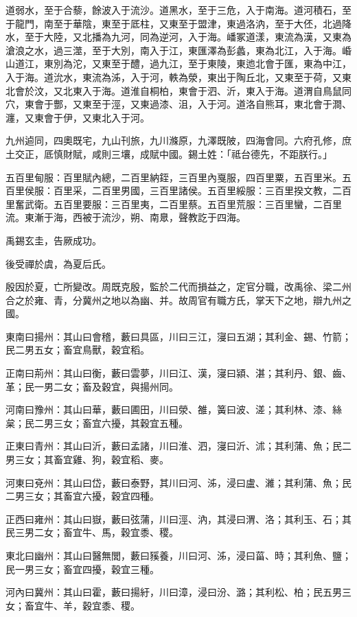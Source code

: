 \begin{pinyinscope}
道弱水，至于合藜，餘波入于流沙。道黑水，至于三危，入于南海。道河積石，至于龍門，南至于華陰，東至于厎柱，又東至于盟津，東過洛汭，至于大伾，北過降水，至于大陸，又北播為九河，同為逆河，入于海。嶓冢道漾，東流為漢，又東為滄浪之水，過三澨，至于大別，南入于江，東匯澤為彭蠡，東為北江，入于海。崏山道江，東別為沱，又東至于醴，過九江，至于東陵，東迆北會于匯，東為中江，入于海。道沇水，東流為泲，入于河，軼為滎，東出于陶丘北，又東至于荷，又東北會於汶，又北東入于海。道淮自桐柏，東會于泗、沂，東入于海。道渭自鳥鼠同穴，東會于酆，又東至于涇，又東過漆、沮，入于河。道洛自熊耳，東北會于澗、瀍，又東會于伊，又東北入于河。

九州逌同，四奧既宅，九山刊旅，九川滌原，九澤既陂，四海會同。六府孔修，庶土交正，厎慎財賦，咸則三壤，成賦中國。錫土姓：「祗台德先，不距朕行。」

五百里甸服：百里賦內總，二百里納銍，三百里內戛服，四百里粟，五百里米。五百里侯服：百里采，二百里男國，三百里諸侯。五百里綏服：三百里揆文教，二百里奮武衛。五百里要服：三百里夷，二百里蔡。五百里荒服：三百里蠻，二百里流。東漸于海，西被于流沙，朔、南臮，聲教訖于四海。

禹錫玄圭，告厥成功。

後受禪於虞，為夏后氏。

殷因於夏，亡所變改。周既克殷，監於二代而損益之，定官分職，改禹徐、梁二州合之於雍、青，分冀州之地以為幽、并。故周官有職方氏，掌天下之地，辯九州之國。

東南曰揚州：其山曰會稽，藪曰具區，川曰三江，寖曰五湖；其利金、錫、竹箭；民二男五女；畜宜鳥獸，穀宜稻。

正南曰荊州：其山曰衡，藪曰雲夢，川曰江、漢，寖曰潁、湛；其利丹、銀、齒、革；民一男二女；畜及穀宜，與揚州同。

河南曰豫州：其山曰華，藪曰圃田，川曰滎、雒，簧曰波、溠；其利林、漆、絲枲；民二男三女；畜宜六擾，其穀宜五種。

正東曰青州：其山曰沂，藪曰孟諸，川曰淮、泗，寖曰沂、沭；其利蒲、魚；民二男三女；其畜宜雞、狗，穀宜稻、麥。

河東曰兗州：其山曰岱，藪曰泰野，其川曰河、泲，浸曰盧、濰；其利蒲、魚；民二男三女；其畜宜六擾，穀宜四種。

正西曰雍州：其山曰嶽，藪曰弦蒲，川曰涇、汭，其浸曰渭、洛；其利玉、石；其民三男二女；畜宜牛、馬，穀宜黍、稷。

東北曰幽州：其山曰醫無閭，藪曰豯養，川曰河、泲，浸曰菑、時；其利魚、鹽；民一男三女；畜宜四擾，穀宜三種。

河內曰冀州：其山曰霍，藪曰揚紆，川曰漳，浸曰汾、潞；其利松、柏；民五男三女；畜宜牛、羊，穀宜黍、稷。


\end{pinyinscope}
